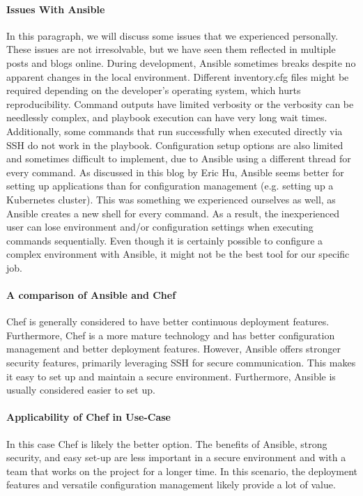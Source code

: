 \paragraph{Issues With Ansible}
In this paragraph, we will discuss some issues that we experienced personally. These issues are not irresolvable, but we have seen them reflected in multiple posts and blogs online. During development, Ansible sometimes breaks despite no apparent changes in the local environment. Different inventory.cfg files might be required depending on the developer's operating system, which hurts reproducibility. Command outputs have limited verbosity or the verbosity can be needlessly complex, and playbook execution can have very long wait times\cite{ansible-slow}. Additionally, some commands that run successfully when executed directly via SSH do not work in the playbook. Configuration setup options are also limited and sometimes difficult to implement, due to Ansible using a different thread for every command. As discussed in this blog by Eric Hu, Ansible seems better for setting up applications than for configuration management (e.g. setting up a Kubernetes cluster)\cite{ansible-comparison}. This was something we experienced ourselves as well, as Ansible creates a new shell for every command. As a result, the inexperienced user can lose environment and/or configuration settings when executing commands sequentially\cite{ansible-shell}. Even though it is certainly possible to configure a complex environment with Ansible, it might not be the best tool for our specific job.
\paragraph{A comparison of Ansible and Chef}\cite{ansible-vs-chef2}\cite{ansible-vs-chef} Chef is generally considered to have better continuous deployment features. Furthermore, Chef is a more mature technology and has better configuration management and better deployment features. However, Ansible offers stronger security features, primarily leveraging SSH for secure communication. This makes it easy to set up and maintain a secure environment. Furthermore, Ansible is usually considered easier to set up. 
\paragraph{Applicability of Chef in Use-Case} In this case Chef is likely the better option. The benefits of Ansible, strong security, and easy set-up are less important in a secure environment and with a team that works on the project for a longer time. In this scenario, the deployment features and versatile configuration management likely provide a lot of value.
